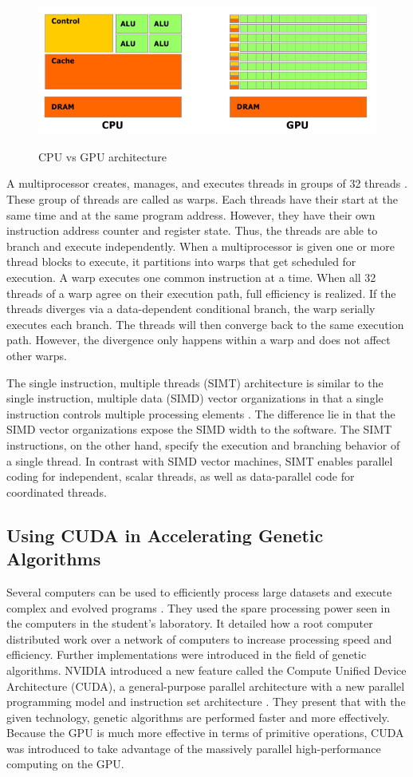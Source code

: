 \begin{figure}
	\centering
		\graphicspath{{images/}}
		\includegraphics[width=190 pt]{cpu_gpu_blackandwhite.png}
	\caption{CPU vs GPU architecture}
	\cite{pdf:NVCudaPrgGuide}
	\label{fig:gpu_diagram}
\end{figure}
\bigskip

A multiprocessor creates, manages, and executes threads in groups of 32
threads \cite{pdf:NVCudaPrgGuide}. 
These group of threads are called as warps. Each threads have their start at the same 
time and at the same program address. However, they have their own instruction address 
counter and register state. Thus, the threads are able to branch and execute independently.
When a multiprocessor is given one or more thread blocks to execute, it partitions into warps 
that get scheduled for execution. A warp executes one common instruction at a time. When
all 32 threads of a warp agree on their execution path, full efficiency is realized. If the threads
diverges via a data-dependent conditional branch, the warp serially executes each branch.
The threads will then converge back to the same execution path.  However, the divergence only
happens within a warp and does not affect other warps.

The single instruction, multiple threads (SIMT) architecture is similar to the single instruction,
multiple data (SIMD) vector organizations in that a single instruction controls multiple processing
elements \cite{pdf:NVCudaPrgGuide}. The difference lie in that the SIMD vector
organizations expose the SIMD width to the software. The SIMT instructions, on
the other hand, specify the execution and branching behavior of a single thread.
In contrast with SIMD vector machines, SIMT enables parallel coding for
independent, scalar threads, as well as data-parallel code for 
coordinated threads. 
	
\subsection{Using CUDA in Accelerating Genetic Algorithms}
Several computers can be used to efficiently process large datasets and execute complex
and evolved programs \cite{Harding09}. They used the spare processing power seen in the
computers in the student's laboratory. It detailed how a root computer distributed work
over a network of computers to increase processing speed and efficiency. Further
implementations were introduced in the field of genetic algorithms. NVIDIA introduced a new 
feature called the Compute Unified Device Architecture (CUDA),
a general-purpose parallel architecture with a new parallel programming model and instruction
set architecture \cite{Zhang09}. They present that with the given technology, genetic algorithms
are performed faster and more effectively. Because the GPU is much more effective in terms of primitive
operations, CUDA was introduced to take advantage of the massively parallel high-performance
computing on the GPU.  


